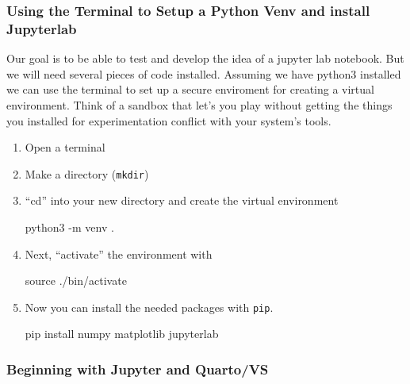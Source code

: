 \documentclass[
  letterpaper,
  DIV=11,
  numbers=noendperiod]{scrreprt}
\newenvironment{Shaded}{\begin{snugshade}}{\end{snugshade}}
\newcommand{\AttributeTok}[1]{\textcolor[rgb]{0.40,0.45,0.13}{#1}}
\newcommand{\BuiltInTok}[1]{\textcolor[rgb]{0.00,0.23,0.31}{#1}}
\newcommand{\ExtensionTok}[1]{\textcolor[rgb]{0.00,0.23,0.31}{#1}}
\newcommand{\NormalTok}[1]{\textcolor[rgb]{0.00,0.23,0.31}{#1}}
\begin{document}
\subsubsection{Using the Terminal to Setup a Python Venv and install
Jupyterlab}\label{using-the-terminal-to-setup-a-python-venv-and-install-jupyterlab}

Our goal is to be able to test and develop the idea of a jupyter lab
notebook. But we will need several pieces of code installed. Assuming we
have python3 installed we can use the terminal to set up a secure
enviroment for creating a virtual environment. Think of a sandbox that
let's you play without getting the things you installed for
experimentation conflict with your system's tools.

\begin{enumerate}
\def\labelenumi{\arabic{enumi}.}
\item
  Open a terminal
\item
  Make a directory (\texttt{mkdir})
\item
  ``cd'' into your new directory and create the virtual environment

\begin{Shaded}
\begin{Highlighting}[]
\ExtensionTok{python3} \AttributeTok{{-}m}\NormalTok{ venv .}
\end{Highlighting}
\end{Shaded}
\item
  Next, ``activate'' the environment with

\begin{Shaded}
\begin{Highlighting}[]
\BuiltInTok{source}\NormalTok{ ./bin/activate}
\end{Highlighting}
\end{Shaded}
\item
  Now you can install the needed packages with \texttt{pip}.

\begin{Shaded}
\begin{Highlighting}[]
\ExtensionTok{pip}\NormalTok{ install numpy matplotlib jupyterlab}
\end{Highlighting}
\end{Shaded}
\end{enumerate}

\subsubsection{Beginning with Jupyter and
Quarto/VS}\label{beginning-with-jupyter-and-quartovs}
\end{document}
